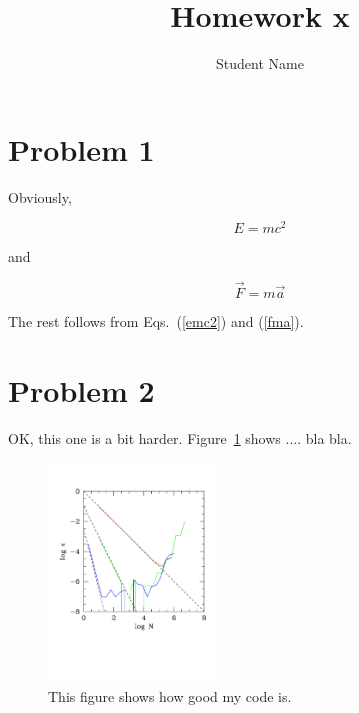 
\pagestyle{plain}
\baselineskip 18pt
\textwidth 6.5in
\textheight 7.8in
\oddsidemargin 0.1in
\evensidemargin 0.1in
\topmargin 0.3in
\parindent 0pt

\newcommand{\beq}{\begin{equation}}
\newcommand{\eeq}{\end{equation}}



\title{Homework x}
\author{Student Name}
\maketitle

\section{Problem 1}

Obviously,

\beq
E=m c^2
\label{emc2}
\eeq

and

\beq
\vec{F} = m \vec{a}
\label{fma}
\eeq

The rest follows from Eqs.~(\ref{emc2}) and (\ref{fma}).

\section{Problem 2}


OK, this one is a bit harder. Figure~\ref{figeps} shows .... bla bla.

\begin{figure}[h]
\begin{center}
\includegraphics[width=0.4\textwidth]{figure1.pdf}
\caption{This figure shows how good my code is.}
\label{figeps}
\end{center}
\end{figure}




